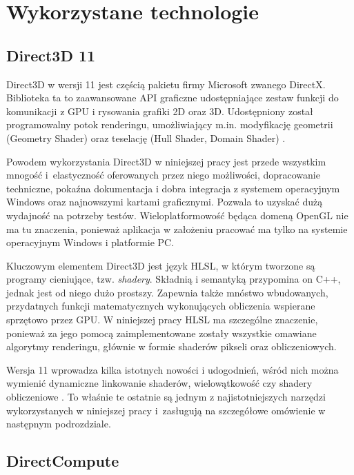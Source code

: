 \chapter{Wykorzystane technologie}
\label{t:technologie}
	
	\section{Direct3D 11}
	\label{t:technologie:directx}
	
	Direct3D w wersji 11 jest częścią pakietu firmy Microsoft zwanego DirectX. Biblioteka ta to zaawansowane API graficzne udostępniające zestaw funkcji do komunikacji z GPU i rysowania grafiki 2D oraz 3D. Udostępniony został programowalny potok renderingu, umożliwiający m.in. modyfikację geometrii (Geometry Shader) oraz teselację (Hull Shader, Domain Shader) \cite{directx0}.
	
	Powodem wykorzystania Direct3D w niniejszej pracy jest przede wszystkim mnogość i~elastyczność oferowanych przez niego możliwości, dopracowanie techniczne, pokaźna dokumentacja i dobra integracja z systemem operacyjnym Windows oraz najnowszymi kartami graficznymi. Pozwala to uzyskać dużą wydajność na potrzeby testów. Wieloplatformowość będąca domeną OpenGL nie ma tu znaczenia, ponieważ aplikacja w założeniu pracować ma tylko na systemie operacyjnym Windows i platformie PC.
	
	Kluczowym elementem Direct3D jest język HLSL, w którym tworzone są programy cieniujące, tzw. \emph{shadery}. Składnią i semantyką przypomina on C++, jednak jest od niego dużo prostszy. Zapewnia także mnóstwo wbudowanych, przydatnych funkcji matematycznych wykonujących obliczenia wspierane sprzętowo przez GPU. W niniejszej pracy HLSL ma szczególne znaczenie, ponieważ za jego pomocą zaimplementowane zostały wszystkie omawiane algorytmy renderingu, głównie w formie shaderów pikseli oraz obliczeniowych.
	
	Wersja 11 wprowadza kilka istotnych nowości i udogodnień, wśród nich można wymienić dynamiczne linkowanie shaderów, wielowątkowość czy shadery obliczeniowe \cite{directx1}. To właśnie te ostatnie są jednym z najistotniejszych narzędzi wykorzystanych w niniejszej pracy i~zasługują na szczegółowe omówienie w następnym podrozdziale.
	
	\section{DirectCompute}
	\label{t:technologie:directcompute}
	
